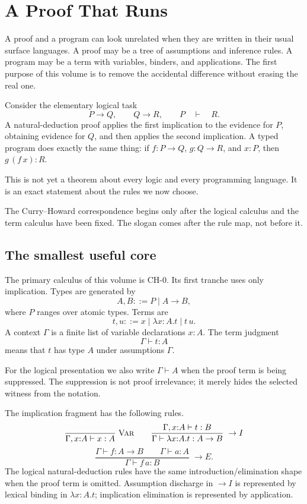 \chapter{A Proof That Runs}
\label{ch:proof-that-runs}

A proof and a program can look unrelated when they are written in their usual surface languages. A proof may be a tree of assumptions and inference rules. A program may be a term with variables, binders, and applications. The first purpose of this volume is to remove the accidental difference without erasing the real one.

Consider the elementary logical task
\[
  P\to Q,\qquad Q\to R,\qquad P \quad\vdash\quad R.
\]
A natural-deduction proof applies the first implication to the evidence for $P$, obtaining evidence for $Q$, and then applies the second implication. A typed program does exactly the same thing: if $f:P\to Q$, $g:Q\to R$, and $x:P$, then $g\,(f\,x):R$.

This is not yet a theorem about every logic and every programming language. It is an exact statement about the rules we now choose.

\begin{principle}
The Curry--Howard correspondence begins only after the logical calculus and the term calculus have been fixed. The slogan comes after the rule map, not before it.
\end{principle}

\section{The smallest useful core}

The primary calculus of this volume is $\mathrm{CH}\text{-}0$. Its first tranche uses only implication. Types are generated by
\[
 A,B ::= P \mid A\to B,
\]
where $P$ ranges over atomic types. Terms are
\[
 t,u ::= x \mid \lambda x{:}A.t \mid t\,u.
\]
A context $\Gamma$ is a finite list of variable declarations $x{:}A$. The term judgment
\[
 \Gamma\vdash t:A
\]
means that $t$ has type $A$ under assumptions $\Gamma$.

For the logical presentation we also write $\Gamma\vdash A$ when the proof term is being suppressed. The suppression is not proof irrelevance; it merely hides the selected witness from the notation.

\begin{formal}[title={Formal Interlude: implication rules}]
The implication fragment has the following rules.
\[
\frac{}{\Gamma,x{:}A\vdash x:A}\;\textsc{Var}
\qquad
\frac{\Gamma,x{:}A\vdash t:B}{\Gamma\vdash \lambda x{:}A.t:A\to B}\;\to I
\]
\[
\frac{\Gamma\vdash f:A\to B\qquad \Gamma\vdash a:A}{\Gamma\vdash f\,a:B}\;\to E.
\]
The logical natural-deduction rules have the same introduction/elimination shape when the proof term is omitted. Assumption discharge in $\to I$ is represented by lexical binding in $\lambda x{:}A.t$; implication elimination is represented by application.
\end{formal}

